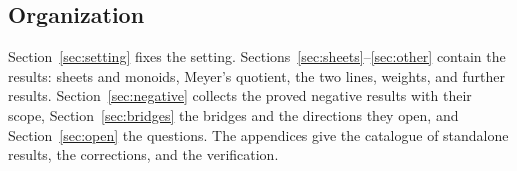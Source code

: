 \subsection*{Organization}

Section~\ref{sec:setting} fixes the setting. Sections~\ref{sec:sheets}--\ref{sec:other} contain the results: sheets and monoids, Meyer's quotient, the two lines, weights, and further results. Section~\ref{sec:negative} collects the proved negative results with their scope, Section~\ref{sec:bridges} the bridges and the directions they open, and Section~\ref{sec:open} the questions. The appendices give the catalogue of standalone results, the corrections, and the verification.
